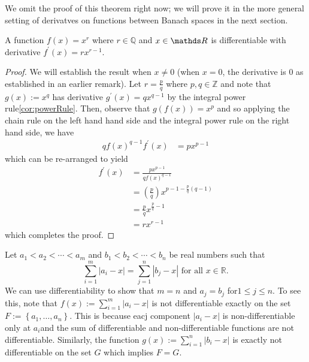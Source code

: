 We omit the proof of this theorem right now; we will prove it in the
more general setting of derivatves on functions between Banach spaces
in the next section.
\begin{prop}
	\label{prop:rationalPowerRule}A function $f\left(x\right)=x^{r}$
	where $r\in\mathds{Q}$ and $x\in\R$ is differentiable with derivative
	$f^{\prime}\left(x\right)=rx^{r-1}.$
\end{prop}

\begin{proof}
	We will establish the result when $x\neq0$ (when $x=0$, the derivative
	is 0 as established in an earlier remark). Let $r=\frac{p}{q}$ where
	$p,q\in\mathds{Z}$ and note that $g\left(x\right):=x^{q}$ has derivative
	$g^{\prime}\left(x\right)=qx^{q-1}$ by the integral power rule\ref{cor:powerRule}.
	Then, observe that $g\left(f\left(x\right)\right)=x^{p}$ and so applying
	the chain rule on the left hand hand side and the integral power rule
	on the right hand side, we have
	\begin{align*}
		qf\left(x\right)^{q-1}f^{\prime}\left(x\right) & =px^{p-1}
	\end{align*}
	which can be re-arranged to yield
	\begin{align*}
		f^{\prime}\left(x\right) & =\frac{px^{p-1}}{qf\left(x\right)^{q-1}}\\
		& =\left(\frac{p}{q}\right)x^{p-1-\frac{p}{q}\left(q-1\right)}\\
		& =\frac{p}{q}x^{\frac{p}{q}-1}\\
		& =rx^{r-1}
	\end{align*}
	which completes the proof.
\end{proof}
\begin{example}
	\label{exa:isi2013psb2} Let $a_{1}<a_{2}<\cdots<a_{m}$ and $b_{1}<b_{2}<\cdots<b_{n}$
	be real numbers such that 
	\[
	\sum_{i=1}^{m}\left|a_{i}-x\right|=\sum_{j=1}^{n}\left|b_{j}-x\right|\text{ for all }x\in\mathbb{R}.
	\]
	We can use differentiability to show that $m=n$ and $a_{j}=b_{j}$
	for$1\leq j\leq n$. To see this, note that $f\left(x\right):=\sum_{i=1}^{m}\lvert a_{i}-x\rvert$
	is not differentiable exactly on the set $F:=\left\{ a_{1},\ldots,a_{n}\right\} .$
	This is because eacj component $\lvert a_{i}-x\rvert$ is non-differentiable
	only at $a_{i}$and the sum of differentiable and non-differentiable
	functions are not differentiable. Similarly, the function $g\left(x\right):=\sum_{i=1}^{n}\lvert b_{i}-x\rvert$
	is exactly not differentiable on the set $G$ which implies $F=G$.
\end{example}


